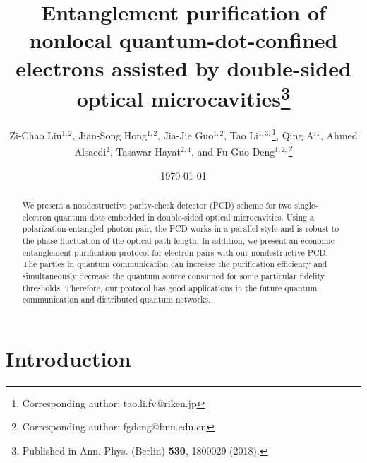 \documentclass[aps,graphicx,twocolumn]{revtex4}%
\begin{document}
\title{Entanglement purification of nonlocal quantum-dot-confined electrons assisted by double-sided optical microcavities\footnote{Published in  Ann. Phys. (Berlin)  \textbf{530}, 1800029 (2018).}}

\author{Zi-Chao Liu$^{1,2}$, Jian-Song Hong$^{1,2}$, Jia-Jie Guo$^{1,2}$,
Tao Li$^{1,3,}$\footnote{Corresponding author: tao.li.fv@riken.jp},
Qing Ai$^{1}$, Ahmed Alsaedi$^{2}$, Tasawar Hayat$^{2,4}$, and
Fu-Guo Deng$^{1,2,}$\footnote{Corresponding author:
fgdeng@bnu.edu.cn}}


\date{\today }



\begin{abstract}
We present a nondestructive parity-check detector (PCD) scheme for
two single-electron quantum dots  embedded in double-sided optical
microcavities. Using a polarization-entangled photon pair, the PCD
works in a parallel style and is robust to the phase fluctuation of
the optical path length. In addition, we present an economic
entanglement purification protocol for electron pairs with our
nondestructive PCD. The parties in quantum communication can
increase the purification efficiency and simultaneously decrease the
quantum source consumed for some particular fidelity thresholds.
Therefore, our protocol has good applications in the future quantum
communication and distributed quantum networks.
 \end{abstract}

\maketitle

\section{Introduction}
\end{document}
